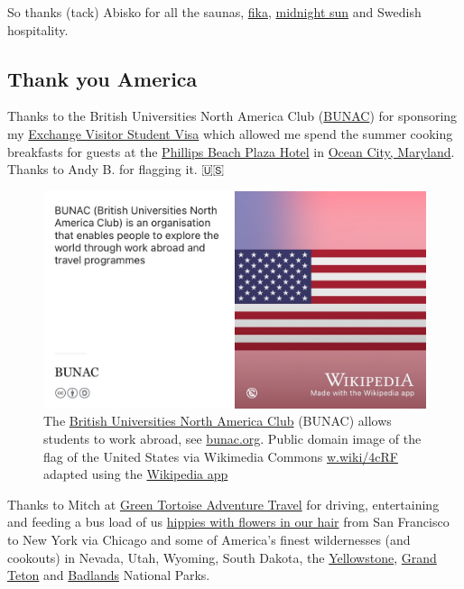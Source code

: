 \documentclass[
]{book}
\begin{document}
So thanks (tack) Abisko for all the saunas, \href{https://www.swedishfood.com/fika}{fika}, \href{https://en.wikipedia.org/wiki/Midnight_sun}{midnight sun} and Swedish hospitality. 🙏

\hypertarget{usa}{%
\subsection{Thank you America}\label{usa}}

Thanks to the British Universities North America Club (\href{https://en.wikipedia.org/wiki/BUNAC}{BUNAC}) for sponsoring my \href{https://travel.state.gov/content/travel/en/us-visas/study/exchange.html}{Exchange Visitor Student Visa} which allowed me spend the summer cooking breakfasts for guests at the \href{https://www.oceancity.com/end-of-an-era-beach-plaza-hotel-closing-permanently/}{Phillips Beach Plaza Hotel} in \href{https://en.wikipedia.org/wiki/Ocean_City,_Maryland}{Ocean City, Maryland}. Thanks to Andy B. for flagging it. 🇺🇸

\begin{figure}

{\centering \includegraphics[width=0.99\linewidth]{images/BUNAC} 

}

\caption{The \href{https://en.wikipedia.org/wiki/BUNAC}{British Universities North America Club} (BUNAC) allows students to work abroad, see \href{https://bunac.org/}{bunac.org}. Public domain image of the flag of the United States via Wikimedia Commons \href{https://w.wiki/4cRF}{w.wiki/4cRF} adapted using the \href{https://apps.apple.com/us/app/wikipedia/id324715238}{Wikipedia app}}\label{fig:bunac-fig}
\end{figure}



Thanks to Mitch at \href{https://greentortoise.com/}{Green Tortoise Adventure Travel} for driving, entertaining and feeding a bus load of us \href{https://en.wikipedia.org/wiki/San_Francisco_(Be_Sure_to_Wear_Flowers_in_Your_Hair)}{hippies with flowers in our hair} from San Francisco to New York via Chicago and some of America's finest wildernesses (and cookouts) in Nevada, Utah, Wyoming, South Dakota, the \href{https://en.wikipedia.org/wiki/Yellowstone_National_Park}{Yellowstone}, \href{https://en.wikipedia.org/wiki/Grand_Teton_National_Park}{Grand Teton} and \href{https://en.wikipedia.org/wiki/Badlands_National_Park}{Badlands} National Parks. \citep{flowersinyourhair}
\end{document}
